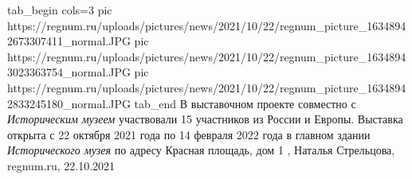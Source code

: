 
\ifcmt
  tab_begin cols=3
     pic https://regnum.ru/uploads/pictures/news/2021/10/22/regnum_picture_16348942673307411_normal.JPG
     pic https://regnum.ru/uploads/pictures/news/2021/10/22/regnum_picture_16348943023363754_normal.JPG
		 pic https://regnum.ru/uploads/pictures/news/2021/10/22/regnum_picture_16348942833245180_normal.JPG
  tab_end
\fi
В выставочном проекте совместно с \emph{Историческим музеем} участвовали 15 участников
из России и Европы. Выставка открыта с 22 октября 2021 года по 14 февраля 2022
года в главном здании \emph{Исторического музея} по адресу Красная площадь, дом 1
, 
Наталья Стрельцова, regnum.ru, 22.10.2021


